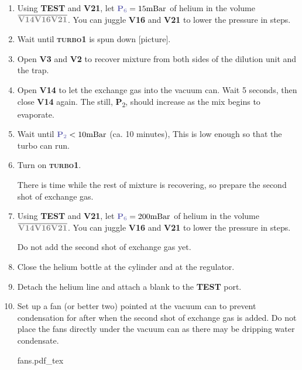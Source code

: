 \documentclass{article}[18pt,A4]
\newcommand{\mBar}{\mathrm{mBar}}
\newcommand{\thing}[1]{{\color{gray}\textsc{ \textbf{#1}}}}
\newcommand{\valve}[1]{{\color{gray}\textbf{V#1}}}
\newcommand{\pressure}[1]{{\color{pressurecolor}\textbf{P}\textsubscript{#1}}}
\newcommand{\volume}[1]{\ensuremath{\overline{#1}}}
\begin{document}
\begin{enumerate}
    \item Using \thing{TEST} and \valve{21}, let $\pressure{6} = 15 \mBar$ of helium in the
    volume \volume{\valve{14} \valve{16} \valve{21}}. You can juggle \valve{16} and \valve{21} to lower the pressure in steps. 
    \item Wait until \thing{turbo1} is spun down [picture].
    \item Open \valve{3} and \valve{2} to recover mixture from both sides of the dilution unit and the trap.
    \item Open \valve{14} to let the exchange gas into the vacuum can. Wait 5 seconds, then close \valve{14} again.
    The still, \pressure{2}, should increase as the mix begins to evaporate.
    \item Wait until $\pressure{2} < 10 \mBar$ (ca. 10 minutes), This is low enough so that the turbo can run.
    \item Turn on \thing{turbo1}.
    
    There is time while the rest of mixture is recovering, so prepare the second shot of exchange gas.
    
    \item Using \thing{TEST} and \valve{21}, let $\pressure{6} = 200 \mBar$ of helium in the
    volume \volume{\valve{14} \valve{16} \valve{21}}. You can juggle \valve{16} and \valve{21} to lower the pressure in steps. 
    
    Do not add the second shot of exchange gas yet.
    
    \item Close the helium bottle at the cylinder and at the regulator.
    \item Detach the helium line and attach a blank to the \thing{TEST} port.
    \item Set up a fan (or better two) pointed at the vacuum can to prevent condensation for after when the second shot of exchange gas is added.
    Do not place the fans directly under the vacuum can as there may be dripping water condensate.
    
    {
    \centering
    {fans.pdf_tex}
    }
        

\end{enumerate}
\end{document}
